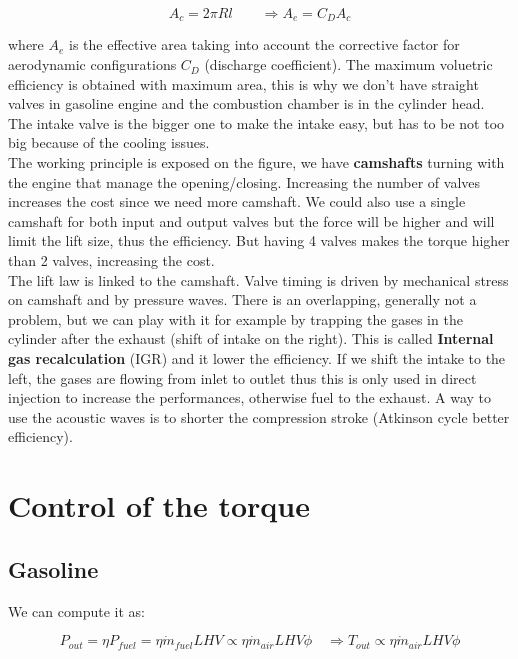 	\begin{equation}
	A_c = 2 \pi R l \qquad \Rightarrow A_e = C_D A_c
	\end{equation}
	
	where $A_e$ is the effective area taking into account the corrective factor for aerodynamic configurations $C_D$ (discharge coefficient). The maximum voluetric efficiency is obtained with maximum area, this is why we don't have straight valves in gasoline engine and the combustion chamber is in the cylinder head. The intake valve is the bigger one to make the intake easy, but has to be not too big because of the cooling issues. 
	\ \\
	
	The working principle is exposed on the figure, we have \textbf{camshafts} turning with the engine that manage the opening/closing. Increasing the number of valves increases the cost since we need more camshaft. We could also use a single camshaft for both input and output valves but the force will be higher and will limit the lift size, thus the efficiency. But having 4 valves makes the torque higher than 2 valves, increasing the cost. 
	\ \\
	
	The lift law is linked to the camshaft. Valve timing is driven by mechanical stress on camshaft and by pressure waves. There is an overlapping, generally not a problem, but we can play with it for example by trapping the gases in the cylinder after the exhaust (shift of intake on the right). This is called \textbf{Internal gas recalculation} (IGR) and it lower the efficiency. If we shift the intake to the left, the gases are flowing from inlet to outlet thus this is only used in direct injection to increase the performances, otherwise fuel to the exhaust. A way to use the acoustic waves is to shorter the compression stroke (Atkinson cycle better efficiency). 
	
\section{Control of the torque}
\subsection{Gasoline}
	We can compute it as: 
	
	\begin{equation}
	P_{out} = \eta P_{fuel} = \eta \dot{m}_{fuel} LHV \propto \eta \dot{m}_{air} LHV \phi \quad \Rightarrow T_{out} \propto \eta \dot{m}_{air} LHV \phi
	\label{eq:7.3}
	\end{equation}
	
